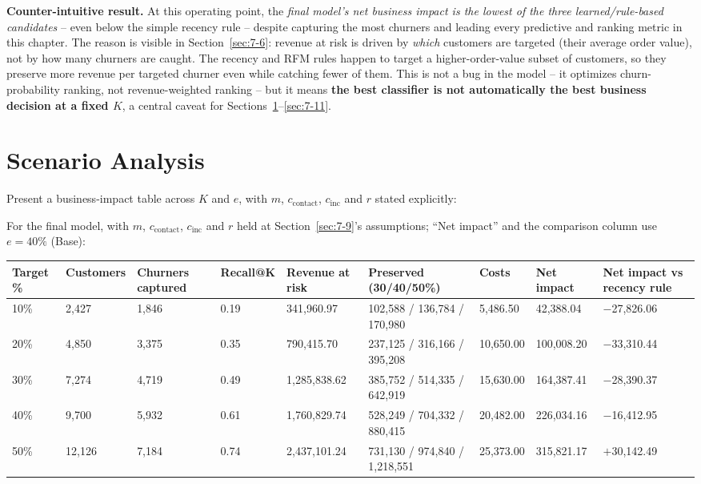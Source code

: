 \textbf{Counter-intuitive result.} At this operating point, the \emph{final model's net business impact is the lowest of the three learned/rule-based candidates} -- even below the simple recency rule -- despite capturing the most churners and leading every predictive and ranking metric in this chapter. The reason is visible in Section~\ref{sec:7-6}: revenue at risk is driven by \emph{which} customers are targeted (their average order value), not by how many churners are caught. The recency and RFM rules happen to target a higher-order-value subset of customers, so they preserve more revenue per targeted churner even while catching fewer of them. This is not a bug in the model -- it optimizes churn-probability ranking, not revenue-weighted ranking -- but it means \textbf{the best classifier is not automatically the best business decision at a fixed $K$}, a central caveat for Sections~\ref{sec:7-10}--\ref{sec:7-11}.

\section{Scenario Analysis}
\label{sec:7-10}

Present a business-impact table across $K$ and $e$, with $m$, $c_{\text{contact}}$, $c_{\text{inc}}$ and $r$ stated explicitly:

For the final model, with $m$, $c_{\text{contact}}$, $c_{\text{inc}}$ and $r$ held at Section~\ref{sec:7-9}'s assumptions; ``Net impact'' and the comparison column use $e=40\%$ (Base):

\begin{center}
\footnotesize
\setlength{\tabcolsep}{3pt}
\begin{tabular}{@{}p{0.9cm}p{1.3cm}p{1.5cm}p{1cm}p{2.3cm}p{2.4cm}p{1.6cm}p{1.7cm}p{1.8cm}@{}}
    \toprule
    Target \% & Customers & Churners captured & Recall\newline @K & Revenue at risk & Preserved (30/40/50\%) & Costs & Net impact & Net impact vs recency rule \\
    \midrule
    10\% & 2,427 & 1,846 & 0.19 & 341,960.97 & 102,588 / 136,784 / 170,980 & 5,486.50 & 42,388.04 & $-$27,826.06 \\
    20\% & 4,850 & 3,375 & 0.35 & 790,415.70 & 237,125 / 316,166 / 395,208 & 10,650.00 & 100,008.20 & $-$33,310.44 \\
    30\% & 7,274 & 4,719 & 0.49 & 1,285,838.62 & 385,752 / 514,335 / 642,919 & 15,630.00 & 164,387.41 & $-$28,390.37 \\
    40\% & 9,700 & 5,932 & 0.61 & 1,760,829.74 & 528,249 / 704,332 / 880,415 & 20,482.00 & 226,034.16 & $-$16,412.95 \\
    50\% & 12,126 & 7,184 & 0.74 & 2,437,101.24 & 731,130 / 974,840 / 1,218,551 & 25,373.00 & 315,821.17 & $+$30,142.49 \\
    \bottomrule
\end{tabular}
\end{center}

